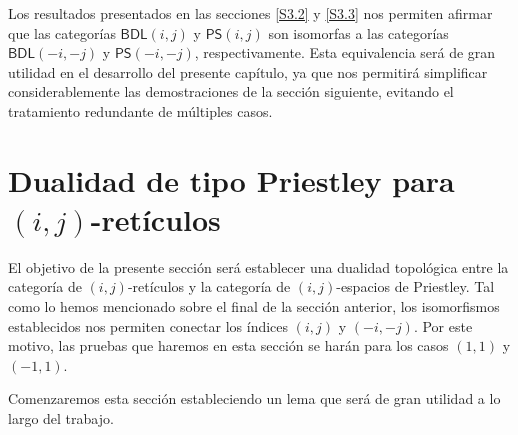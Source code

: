 \documentclass[12pt]{book}
\newcommand{\BDL}{\mathsf{BDL}}
\newcommand{\PS}{\mathsf{PS}}
\begin{document}
\bigskip

Los resultados presentados en las secciones \ref{S3.2} y \ref{S3.3} nos permiten afirmar que las categorías $\BDL(i,j)$ y $\PS(i,j)$ son isomorfas a las categorías $\BDL(-i,-j)$ y $\PS(-i,-j)$, respectivamente. Esta equivalencia será de gran utilidad
en el desarrollo del presente capítulo, ya que nos permitirá simplificar considerablemente las demostraciones de la sección siguiente, evitando el tratamiento redundante de múltiples casos.



\section{Dualidad de tipo Priestley para $(i,j)$-retículos}

El objetivo de la presente sección será establecer una dualidad topológica entre la categoría de $(i,j)$-retículos y la categoría de $(i,j)$-espacios de Priestley. Tal como lo hemos mencionado sobre el final de la sección anterior, los isomorfismos establecidos nos permiten conectar los índices $(i,j)$ y $(-i,-j)$. Por este motivo, las pruebas que haremos en esta sección se harán para los casos $(1,1)$ y $(-1,1)$. \\

\vspace{0.2cm}

Comenzaremos esta sección estableciendo un lema que será de gran utilidad a lo largo del trabajo.
\end{document}
